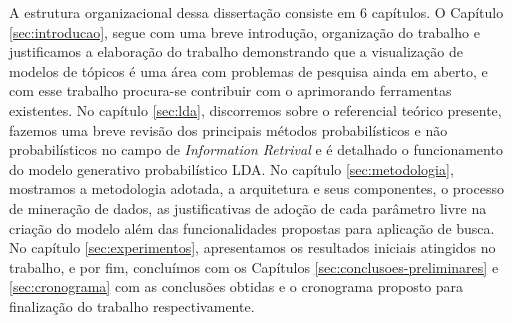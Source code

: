 \documentclass[12pt,a4paper]{article}
\begin{document}
 A estrutura organizacional dessa dissertação consiste em 6 capítulos. O Capítulo \ref{sec:introducao}, segue com uma breve introdução, organização do trabalho e justificamos a elaboração do trabalho
  demonstrando que a visualização de modelos de tópicos é uma área com problemas de pesquisa ainda em aberto, e com esse trabalho procura-se contribuir com o aprimorando ferramentas existentes. 
  No capítulo \ref{sec:lda}, discorremos sobre o referencial teórico presente, fazemos uma breve revisão dos principais métodos probabilísticos e não probabilísticos no campo de \textit{Information Retrival}
  e é detalhado o funcionamento do modelo generativo probabilístico LDA. No capítulo \ref{sec:metodologia}, mostramos a metodologia adotada, 
  a arquitetura e seus componentes, o processo de mineração de dados, as justificativas de adoção de cada parâmetro livre na criação do modelo além das funcionalidades propostas para
  aplicação de busca. No capítulo \ref{sec:experimentos}, apresentamos os resultados iniciais atingidos no trabalho, e por fim, concluímos com os Capítulos \ref{sec:conclusoes-preliminares} e \ref{sec:cronograma}
  com as conclusões obtidas e o cronograma proposto para finalização do trabalho respectivamente.







 
 
\end{document}
